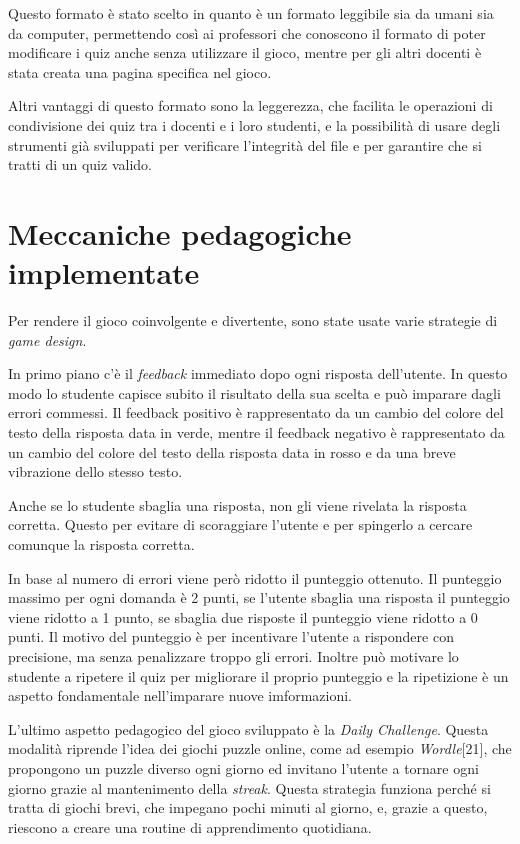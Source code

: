 Questo formato è stato scelto in quanto è un formato leggibile sia da umani sia da computer, permettendo così ai professori che conoscono il formato di poter modificare i quiz anche senza utilizzare il gioco, mentre per gli altri docenti è stata creata una pagina specifica nel gioco.

Altri vantaggi di questo formato sono la leggerezza, che facilita le operazioni di condivisione dei quiz tra i docenti e i loro studenti, e la possibilità di usare degli strumenti già sviluppati per verificare l'integrità del file e per garantire che si tratti di un quiz valido.

\section{Meccaniche pedagogiche implementate}
Per rendere il gioco coinvolgente e divertente, sono state usate varie strategie di \textit{game design}.

In primo piano c'è il \textit{feedback} immediato dopo ogni risposta dell'utente. In questo modo lo studente capisce subito il risultato della sua scelta e può imparare dagli errori commessi.
Il feedback positivo è rappresentato da un cambio del colore del testo della risposta data in verde, mentre il feedback negativo è rappresentato da un cambio del colore del testo della risposta data in rosso e da una breve vibrazione dello stesso testo.

Anche se lo studente sbaglia una risposta, non gli viene rivelata la risposta corretta. Questo per evitare di scoraggiare l'utente e per spingerlo a cercare comunque la risposta corretta.

In base al numero di errori viene però ridotto il punteggio ottenuto. Il punteggio massimo per ogni domanda è 2 punti, se l'utente sbaglia una risposta il punteggio viene ridotto a 1 punto, se sbaglia due risposte il punteggio viene ridotto a 0 punti.
Il motivo del punteggio è per incentivare l'utente a rispondere con precisione, ma senza penalizzare troppo gli errori.
Inoltre può motivare lo studente a ripetere il quiz per migliorare il proprio punteggio e la ripetizione è un aspetto fondamentale nell'imparare nuove imformazioni.

L'ultimo aspetto pedagogico del gioco sviluppato è la \textit{Daily Challenge}. Questa modalità riprende l'idea dei giochi puzzle online, come ad esempio \textit{Wordle}[21], che propongono un puzzle diverso ogni giorno ed invitano l'utente a tornare ogni giorno grazie al mantenimento della \textit{streak}.
Questa strategia funziona perché si tratta di giochi brevi, che impegano pochi minuti al giorno, e, grazie a questo, riescono a creare una routine di apprendimento quotidiana.

